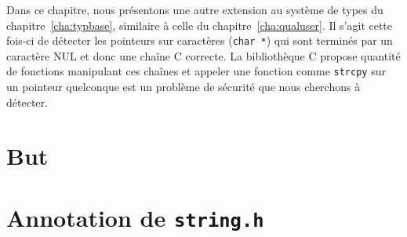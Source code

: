 Dans ce chapitre, nous présentons une autre extension au système de types du
chapitre~\ref{cha:typbase}, similaire à celle du chapitre~\ref{cha:qualuser}.
Il s'agit cette fois-ci de détecter les pointeurs sur caractères (\texttt{char
*}) qui sont terminés par un caractère NUL et donc une chaîne C correcte. La
bibliothèque C propose quantité de fonctions manipulant ces chaînes et appeler
une fonction comme \texttt{strcpy} sur un pointeur quelconque est un problème de
sécurité que nous cherchons à détecter.

\section{But}
\section{Annotation de \texttt{string.h}}
